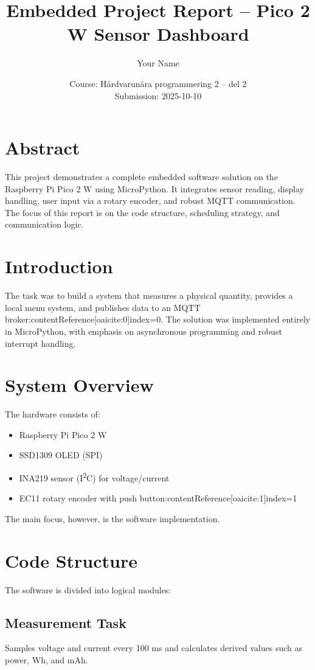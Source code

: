 \documentclass[a4paper,12pt]{article}
\title{Embedded Project Report -- Pico 2 W Sensor Dashboard}
\author{Your Name}
\date{Course: Hårdvarunära programmering 2 -- del 2 \\ Submission: 2025-10-10}
\begin{document}
\maketitle

\section*{Abstract}
This project demonstrates a complete embedded software solution on the Raspberry Pi Pico 2 W using MicroPython.  
It integrates sensor reading, display handling, user input via a rotary encoder, and robust MQTT communication.  
The focus of this report is on the code structure, scheduling strategy, and communication logic.

\section{Introduction}
The task was to build a system that measures a physical quantity, provides a local menu system, and publishes data to an MQTT broker:contentReference[oaicite:0]{index=0}.  
The solution was implemented entirely in MicroPython, with emphasis on asynchronous programming and robust interrupt handling.

\section{System Overview}
The hardware consists of:
\begin{itemize}
    \item Raspberry Pi Pico 2 W
    \item SSD1309 OLED (SPI)
    \item INA219 sensor (I\textsuperscript{2}C) for voltage/current
    \item EC11 rotary encoder with push button:contentReference[oaicite:1]{index=1}
\end{itemize}
The main focus, however, is the software implementation.

\section{Code Structure}
The software is divided into logical modules:

\subsection{Measurement Task}
Samples voltage and current every 100 ms and calculates derived values such as power, Wh, and mAh.
\end{document}
